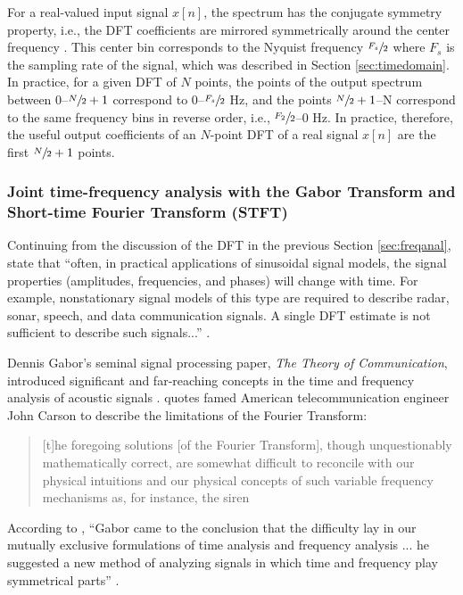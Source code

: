 \documentclass[report.tex]{subfiles}
\begin{document}
For a real-valued input signal $x[n]$, the spectrum has the conjugate symmetry property, i.e., the DFT coefficients are mirrored symmetrically around the center frequency \parencite{dspfirst}. This center bin corresponds to the Nyquist frequency $\sfrac{F_{s}}{2}$ where $F_{s}$ is the sampling rate of the signal, which was described in Section \ref{sec:timedomain}. In practice, for a given DFT of $N$ points, the points of the output spectrum between 0--$\sfrac{N}{2}+1$ correspond to 0--$\sfrac{F_{s}}{2}$ Hz, and the points $\sfrac{N}{2}+1$--N correspond to the same frequency bins in reverse order, i.e., $\sfrac{F_{2}}{2}$--0 Hz. In practice, therefore, the useful output coefficients of an $N$-point DFT of a real signal $x[n]$ are the first $\sfrac{N}{2}+1$ points.

\newpagefill

\subsubsection{Joint time-frequency analysis with the Gabor Transform and Short-time Fourier Transform (STFT)}
\label{sec:jointtfa}

Continuing from the discussion of the DFT in the previous Section \ref{sec:freqanal},\citeauthor{discretebook} state that ``often, in practical applications of sinusoidal signal models, the signal properties (amplitudes, frequencies, and phases) will change with time. For example, nonstationary signal models of this type are required to describe radar, sonar, speech, and data communication signals. A single DFT estimate is not sufficient to describe such signals...'' \parencite[714]{discretebook}.

Dennis Gabor's seminal signal processing paper, \textit{The Theory of Communication}, introduced significant and far-reaching concepts in the time and frequency analysis of acoustic signals \parencite{gabor1946}. \citeauthor{gabor1946} quotes famed American telecommunication engineer John Carson \parencite{carsonfamous} to describe the limitations of the Fourier Transform:

\begin{quote}
	[t]he foregoing solutions [of the Fourier Transform], though unquestionably mathematically correct, are somewhat difficult to reconcile with our physical intuitions and our physical concepts of such variable frequency mechanisms as, for instance, the siren \parencite[431]{gabor1946}
\end{quote}

According to \citeauthor{korpel}, ``Gabor came to the conclusion that the difficulty lay in our mutually exclusive formulations of time analysis and frequency analysis ... he suggested a new method of analyzing signals in which time and frequency play symmetrical parts'' \parencite[3,624]{korpel}.
\end{document}

